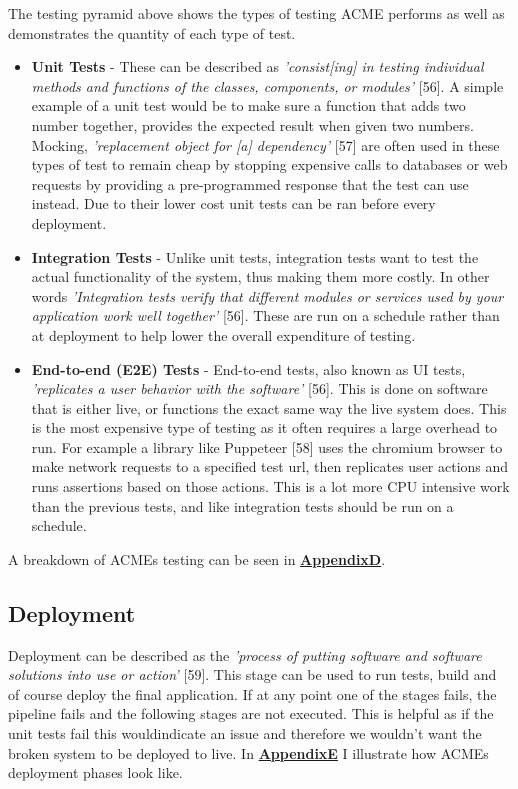   The testing pyramid above shows the types of testing ACME performs as well as demonstrates the quantity of each type of test.
  \begin{itemize}
    \item \textbf{Unit Tests} - These can be described as \textit{'consist[ing] in testing individual methods and functions of the classes, components, 
    or modules'} [56]. A simple example of a unit test would be to make sure a function that adds two number together, provides the expected result
    when given two numbers. Mocking, \textit{'replacement object for [a] dependency'} [57] are often used in these types of test to remain cheap by
    stopping expensive calls to databases or web requests by providing a pre-programmed response that the test can use instead. Due to their 
    lower cost unit tests can be ran before every deployment.

    \item \textbf{Integration Tests} - Unlike unit tests, integration tests want to test the actual functionality of the system, thus 
    making them more costly. In other words \textit{'Integration tests verify that different modules or services used by your application work well
    together'} [56]. These are run on a schedule rather than at deployment to help lower the overall expenditure of testing. 
  
    \item \textbf{End-to-end (E2E) Tests} - End-to-end tests, also known as UI tests, \textit{'replicates a user behavior with the software'} [56].
    This is done on software that is either live, or functions the exact same way the live system does. This is the most expensive type of testing as
    it often requires a large overhead to run. For example a library like Puppeteer [58] uses the chromium browser to make network requests to a 
    specified test url, then replicates user actions and runs assertions based on those actions. This is a lot more CPU intensive work than the 
    previous tests, and like integration tests should be run on a schedule.
  \end{itemize}

  A breakdown of ACMEs testing can be seen in \hyperref[sec:AppendixD]{\textbf{AppendixD}}.

  \subsection{Deployment}
  \label{sec:Deployment}

  Deployment can be described as the \textit{'process of putting software and software solutions into use or action'} [59]. This stage can be
  used to run tests, build and of course deploy the final application. If at any point one of the stages fails, the pipeline fails and the following 
  stages are not executed. This is helpful as if the unit tests fail this wouldindicate an issue and therefore we wouldn't want the broken system to 
  be deployed to live. In \hyperref[sec:AppendixE]{\textbf{AppendixE}} I illustrate how ACMEs deployment phases look like.

\newpage